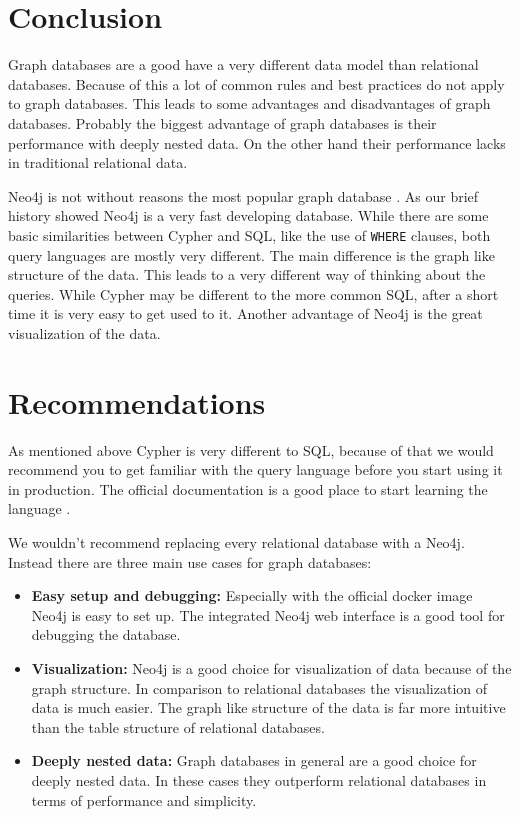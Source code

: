 \section{Conclusion}
Graph databases are a good have a very different data model than relational
databases. Because of this a lot of common rules and best practices do not apply
to graph databases. This leads to some advantages and disadvantages of graph
databases. Probably the biggest advantage of graph databases is their
performance with deeply nested data. On the other hand their performance lacks
in traditional relational data.

Neo4j is not without reasons the most popular graph database
\parencite{db-engines}. As our brief history showed Neo4j is a very fast
developing database. While there are some basic similarities between Cypher and
SQL, like the use of \texttt{WHERE} clauses, both query languages are mostly
very different. The main difference is the graph like structure of the data.
This leads to a very different way of thinking about the queries. While Cypher
may be different to the more common SQL, after a short time it is very easy to
get used to it. Another advantage of Neo4j is the great visualization of the
data.

\section{Recommendations}
As mentioned above Cypher is very different to SQL, because of that we would
recommend you to get familiar with the query language before you start using it
in production. The official documentation is a good place to start learning the
language \parencite{neo4j:cypher-manual}.

We wouldn't recommend replacing every relational database with a Neo4j.
Instead there are three main use cases for graph databases:
\begin{itemize}
      \item \textbf{Easy setup and debugging:} Especially with the official docker
            image Neo4j is easy to set up. The integrated Neo4j web interface is a good tool for
            debugging the database.
      \item \textbf{Visualization:} Neo4j is a good choice for visualization of data
            because of the graph structure. In comparison to relational databases the
            visualization of data is much easier. The graph like structure of the data is
            far more intuitive than the table structure of relational databases.
      \item \textbf{Deeply nested data:} Graph databases in general are a good choice
            for deeply nested data. In these cases they outperform relational databases in
            terms of performance and simplicity.
\end{itemize}
